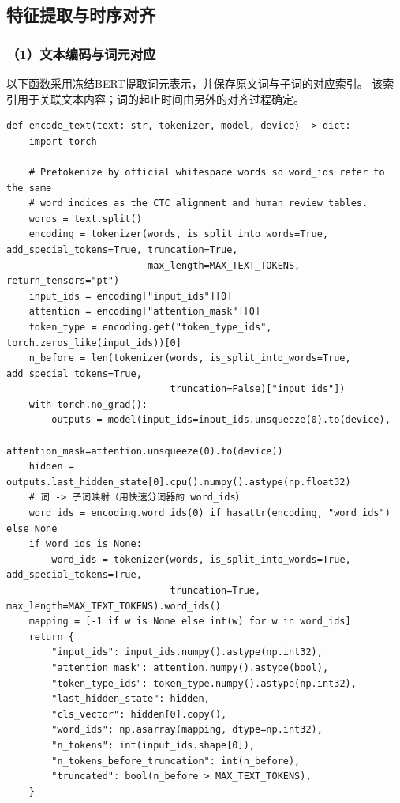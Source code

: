 \subsection{特征提取与时序对齐}
\subsubsection*{（1）文本编码与词元对应}
以下函数采用冻结BERT提取词元表示，并保存原文词与子词的对应索引。
该索引用于关联文本内容；词的起止时间由另外的对齐过程确定。

\begin{lstlisting}
def encode_text(text: str, tokenizer, model, device) -> dict:
    import torch

    # Pretokenize by official whitespace words so word_ids refer to the same
    # word indices as the CTC alignment and human review tables.
    words = text.split()
    encoding = tokenizer(words, is_split_into_words=True, add_special_tokens=True, truncation=True,
                         max_length=MAX_TEXT_TOKENS, return_tensors="pt")
    input_ids = encoding["input_ids"][0]
    attention = encoding["attention_mask"][0]
    token_type = encoding.get("token_type_ids", torch.zeros_like(input_ids))[0]
    n_before = len(tokenizer(words, is_split_into_words=True, add_special_tokens=True,
                             truncation=False)["input_ids"])
    with torch.no_grad():
        outputs = model(input_ids=input_ids.unsqueeze(0).to(device),
                        attention_mask=attention.unsqueeze(0).to(device))
    hidden = outputs.last_hidden_state[0].cpu().numpy().astype(np.float32)
    # 词 -> 子词映射（用快速分词器的 word_ids）
    word_ids = encoding.word_ids(0) if hasattr(encoding, "word_ids") else None
    if word_ids is None:
        word_ids = tokenizer(words, is_split_into_words=True, add_special_tokens=True,
                             truncation=True, max_length=MAX_TEXT_TOKENS).word_ids()
    mapping = [-1 if w is None else int(w) for w in word_ids]
    return {
        "input_ids": input_ids.numpy().astype(np.int32),
        "attention_mask": attention.numpy().astype(bool),
        "token_type_ids": token_type.numpy().astype(np.int32),
        "last_hidden_state": hidden,
        "cls_vector": hidden[0].copy(),
        "word_ids": np.asarray(mapping, dtype=np.int32),
        "n_tokens": int(input_ids.shape[0]),
        "n_tokens_before_truncation": int(n_before),
        "truncated": bool(n_before > MAX_TEXT_TOKENS),
    }
\end{lstlisting}

